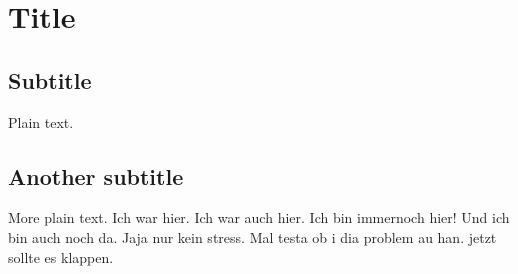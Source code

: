 \documentclass{article}
\begin{document}
\section{Title}

\subsection{Subtitle}

Plain text.

\subsection{Another subtitle}

More plain text.
Ich war hier.
Ich war auch hier.
Ich bin immernoch hier!
Und ich bin auch noch da.
Jaja nur kein stress.
Mal testa ob i dia problem au han.
jetzt sollte es klappen.
\end{document}
